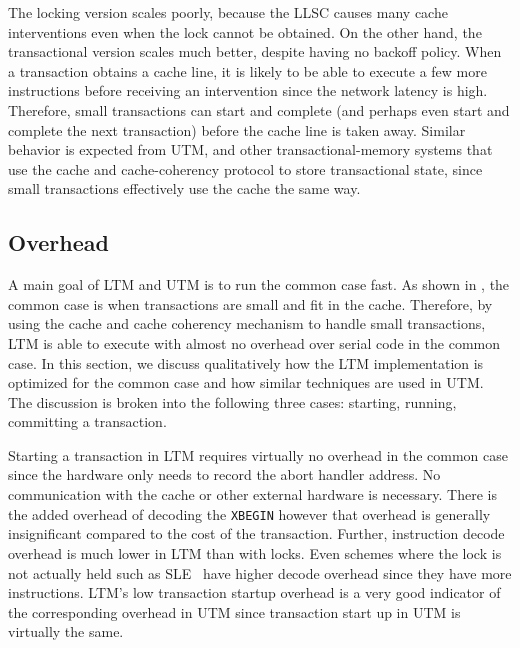 The locking version scales poorly, because the LLSC causes many cache
interventions even when the lock cannot be obtained. On the other
hand, the transactional version scales much better, despite having no
backoff policy.  When a transaction obtains a cache line, it is likely
to be able to execute a few more instructions before receiving an
intervention since the network latency is high.  Therefore, small
transactions can start and complete (and perhaps even start and
complete the next transaction) before the cache line is taken away.
Similar behavior is expected from UTM, and other transactional-memory
systems that use the cache and cache-coherency protocol to store
transactional state, since small transactions effectively use the
cache the same way. 

\subsection{Overhead}

A main goal of LTM and UTM is to run the common case fast. As shown in
, the common case is when transactions are small
and fit in the cache. Therefore, by using the cache and cache
coherency mechanism to handle small transactions, LTM is able to
execute with almost no overhead over serial code in the common
case. In this section, we discuss qualitatively how the LTM
implementation is optimized for the common case and how similar
techniques are used in UTM. The discussion is broken into the
following three cases: starting, running, committing a transaction.

Starting a transaction in LTM requires virtually no overhead in the
common case since the hardware only needs to record the abort handler
address. No communication with the cache or other external hardware is
necessary. There is the added overhead of decoding the \texttt{XBEGIN}
however that overhead is generally insignificant compared to the cost
of the transaction. Further, instruction decode overhead is much lower
in LTM than with locks. Even schemes where the lock is not actually
held such as SLE~\cite{RajwarGo01} have higher decode overhead since they have more
instructions. LTM's low transaction startup overhead is a very good
indicator of the corresponding overhead in UTM since transaction start
up in UTM is virtually the same.

